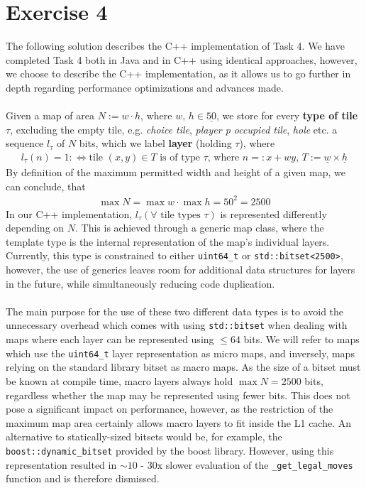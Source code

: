 \section{Exercise 4}
The following solution describes the C++ implementation of Task 4. We have completed Task 4 both in Java and in C++ using identical approaches, however, we choose to describe the C++ implementation, as it allows us to go further in depth regarding performance optimizations and advances made. \\\\
Given a map of area \(N := w \cdot h\), where \(w,\,h \in \underline{50}\), we store for every \textbf{type of tile} \(\tau\), excluding the empty tile, e.g. \textit{choice tile}, \textit{player p occupied tile}, \textit{hole} etc. a sequence \(l_\tau\) of \(N\) bits, which we label \textbf{layer} (holding \(\tau\)), where
\begin{align*}
	l_\tau(n) = 1 :\Leftrightarrow \text{tile \(\left(x, y\right) \in T\) is of type \(\tau\), where \(n =: x + wy,\,T := \underline{w} \times \underline{h}\)}
\end{align*}
By definition of the maximum permitted width and height of a given map, we can conclude, that
\begin{align*}
	\max N = \max w \cdot \max h = 50^2 = 2500
\end{align*}
In our C++ implementation, \(l_\tau \left(\forall \text{ tile types } \tau\right)\) is represented differently depending on \(N\). This is achieved through a generic map class, where the template type is the internal representation of the map's individual layers. Currently, this type is constrained to either \texttt{uint64\_t} or \texttt{std::bitset<2500>}, however, the use of generics leaves room for additional data structures for layers in the future, while simultaneously reducing code duplication. \\\\
The main purpose for the use of these two different data types is to avoid the unnecessary overhead which comes with using \texttt{std::bitset} when dealing with maps where each layer can be represented using \(\leq 64\) bits. We will refer to maps which use the \texttt{uint64\_t} layer representation as micro maps, and inversely, maps relying on the standard library bitset as macro maps. As the size of a bitset must be known at compile time, macro layers always hold \(\max N = 2500\) bits, regardless whether the map may be represented using fewer bits. This does not pose a significant impact on performance, however, as the restriction of the maximum map area certainly allows macro layers to fit inside the L1 cache. An alternative to statically-sized bitsets would be, for example, the \texttt{boost::dynamic\_bitset} provided by the boost library. However, using this representation resulted in \(\sim\text{10 - 30x}\) slower evaluation of the \texttt{\_get\_legal\_moves} function and is therefore dismissed. \\\\
